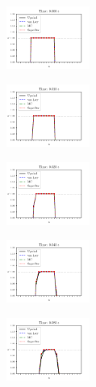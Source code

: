 \documentclass[journal,onecolumn]{IEEEtran}
\begin{document}
\begin{figure}
    \centering
    \begin{subfigure}{\textwidth}
    \centering
    \includegraphics[width=0.3\textwidth]{figures/limiter_initial.pdf}
    \end{subfigure}
    \begin{subfigure}{\textwidth}
    \centering
    \includegraphics[width=0.3\textwidth]{figures/limiter0.010.pdf}
    \end{subfigure}
    \begin{subfigure}{\textwidth}
    \centering
    \includegraphics[width=0.3\textwidth]{figures/limiter0.020.pdf}
    \end{subfigure}
    \begin{subfigure}{\textwidth}
    \centering
    \includegraphics[width=0.3\textwidth]{figures/limiter0.040.pdf}
    \end{subfigure}
    \begin{subfigure}{\textwidth}
    \centering
    \includegraphics[width=0.3\textwidth]{figures/limiter0.080.pdf}

\end{subfigure}
\end{figure}
\end{document}

